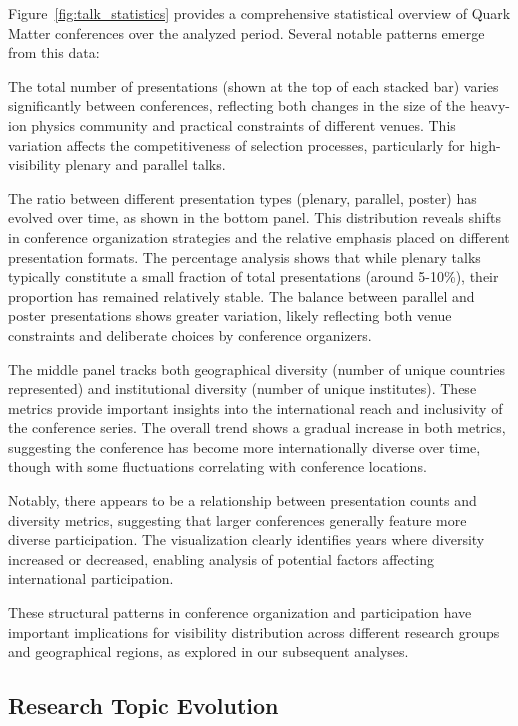 \documentclass[a4paper,11pt]{article}
\begin{document}
Figure~\ref{fig:talk_statistics} provides a comprehensive statistical overview of Quark Matter conferences over the analyzed period. Several notable patterns emerge from this data:

The total number of presentations (shown at the top of each stacked bar) varies significantly between conferences, reflecting both changes in the size of the heavy-ion physics community and practical constraints of different venues. This variation affects the competitiveness of selection processes, particularly for high-visibility plenary and parallel talks.

The ratio between different presentation types (plenary, parallel, poster) has evolved over time, as shown in the bottom panel. This distribution reveals shifts in conference organization strategies and the relative emphasis placed on different presentation formats. The percentage analysis shows that while plenary talks typically constitute a small fraction of total presentations (around 5-10\%), their proportion has remained relatively stable. The balance between parallel and poster presentations shows greater variation, likely reflecting both venue constraints and deliberate choices by conference organizers.

The middle panel tracks both geographical diversity (number of unique countries represented) and institutional diversity (number of unique institutes). These metrics provide important insights into the international reach and inclusivity of the conference series. The overall trend shows a gradual increase in both metrics, suggesting the conference has become more internationally diverse over time, though with some fluctuations correlating with conference locations.

Notably, there appears to be a relationship between presentation counts and diversity metrics, suggesting that larger conferences generally feature more diverse participation. The visualization clearly identifies years where diversity increased or decreased, enabling analysis of potential factors affecting international participation.

These structural patterns in conference organization and participation have important implications for visibility distribution across different research groups and geographical regions, as explored in our subsequent analyses.

\subsection{Research Topic Evolution}
\end{document}

